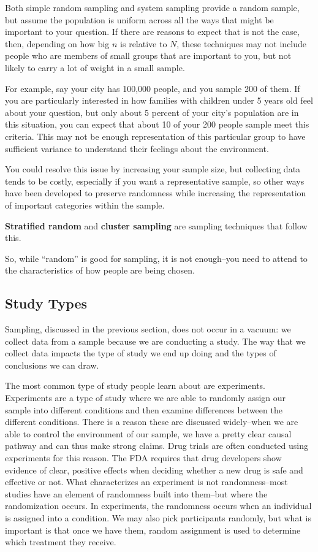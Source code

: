 \documentclass[
]{book}
\theoremstyle{definition}
\theoremstyle{definition}
\theoremstyle{definition}
\theoremstyle{definition}
\theoremstyle{remark}
\begin{document}
Both simple random sampling and system sampling provide a random sample, but assume the population is uniform across all the ways that might be important to your question. If there are reasons to expect that is not the case, then, depending on how big \(n\) is relative to \(N\), these techniques may not include people who are members of small groups that are important to you, but not likely to carry a lot of weight in a small sample.

For example, say your city has 100,000 people, and you sample 200 of them. If you are particularly interested in how families with children under 5 years old feel about your question, but only about 5 percent of your city's population are in this situation, you can expect that about 10 of your 200 people sample meet this criteria. This may not be enough representation of this particular group to have sufficient variance to understand their feelings about the environment.

You could resolve this issue by increasing your sample size, but collecting data tends to be costly, especially if you want a representative sample, so other ways have been developed to preserve randomness while increasing the representation of important categories within the sample.

\textbf{Stratified random} and \textbf{cluster sampling} are sampling techniques that follow this.

So, while ``random'' is good for sampling, it is not enough--you need to attend to the characteristics of how people are being chosen.

\hypertarget{study-types}{%
\subsection{Study Types}\label{study-types}}

Sampling, discussed in the previous section, does not occur in a vacuum: we collect data from a sample because we are conducting a study. The way that we collect data impacts the type of study we end up doing and the types of conclusions we can draw.

The most common type of study people learn about are experiments. Experiments are a type of study where we are able to randomly assign our sample into different conditions and then examine differences between the different conditions. There is a reason these are discussed widely--when we are able to control the environment of our sample, we have a pretty clear causal pathway and can thus make strong claims. Drug trials are often conducted using experiments for this reason. The FDA requires that drug developers show evidence of clear, positive effects when deciding whether a new drug is safe and effective or not. What characterizes an experiment is not randomness--most studies have an element of randomness built into them--but where the randomization occurs. In experiments, the randomness occurs when an individual is assigned into a condition. We may also pick participants randomly, but what is important is that once we have them, random assignment is used to determine which treatment they receive.
\end{document}
